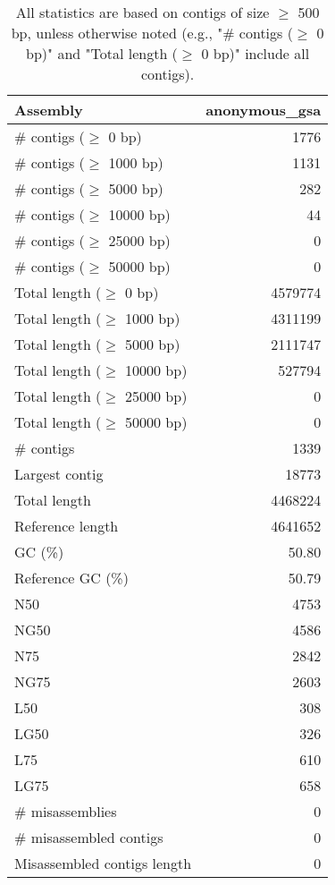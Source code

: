 \documentclass[12pt,a4paper]{article}
\begin{document}
\begin{table}[ht]
\begin{center}
\caption{All statistics are based on contigs of size $\geq$ 500 bp, unless otherwise noted (e.g., "\# contigs ($\geq$ 0 bp)" and "Total length ($\geq$ 0 bp)" include all contigs).}
\begin{tabular}{|l*{1}{|r}|}
\hline
Assembly & anonymous\_gsa \\ \hline
\# contigs ($\geq$ 0 bp) & 1776 \\ \hline
\# contigs ($\geq$ 1000 bp) & 1131 \\ \hline
\# contigs ($\geq$ 5000 bp) & 282 \\ \hline
\# contigs ($\geq$ 10000 bp) & 44 \\ \hline
\# contigs ($\geq$ 25000 bp) & 0 \\ \hline
\# contigs ($\geq$ 50000 bp) & 0 \\ \hline
Total length ($\geq$ 0 bp) & 4579774 \\ \hline
Total length ($\geq$ 1000 bp) & 4311199 \\ \hline
Total length ($\geq$ 5000 bp) & 2111747 \\ \hline
Total length ($\geq$ 10000 bp) & 527794 \\ \hline
Total length ($\geq$ 25000 bp) & 0 \\ \hline
Total length ($\geq$ 50000 bp) & 0 \\ \hline
\# contigs & 1339 \\ \hline
Largest contig & 18773 \\ \hline
Total length & 4468224 \\ \hline
Reference length & 4641652 \\ \hline
GC (\%) & 50.80 \\ \hline
Reference GC (\%) & 50.79 \\ \hline
N50 & 4753 \\ \hline
NG50 & 4586 \\ \hline
N75 & 2842 \\ \hline
NG75 & 2603 \\ \hline
L50 & 308 \\ \hline
LG50 & 326 \\ \hline
L75 & 610 \\ \hline
LG75 & 658 \\ \hline
\# misassemblies & 0 \\ \hline
\# misassembled contigs & 0 \\ \hline
Misassembled contigs length & 0 \\ \hline

\end{tabular}
\end{center}
\end{table}
\end{document}

